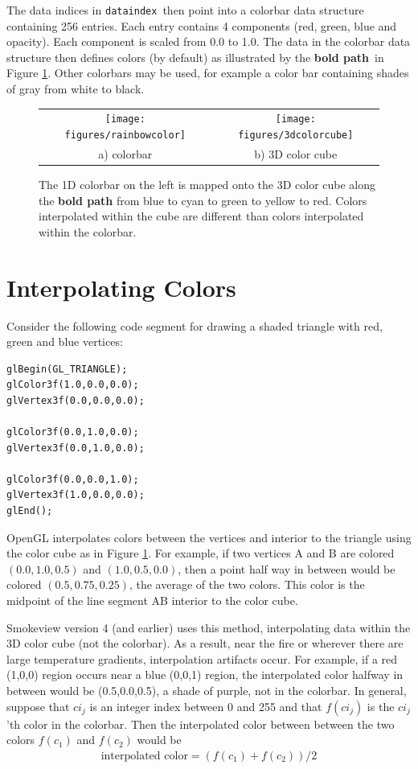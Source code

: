 \documentclass[11pt,twoside]{book}
\newcommand{\figoptions}{htp}
\begin{document}
The data indices in {\tt dataindex}\ then point into a colorbar data structure containing 256 entries.  Each entry contains 4 components (red, green, blue and opacity).  Each component is scaled from 0.0 to 1.0.  The data in the colorbar data structure then defines colors (by default) as illustrated by the {\bf bold path}\ in Figure \ref{colorbarinfo}.  Other colorbars may be used, for example a color bar containing shades of gray from white to black.


\begin{figure}[\figoptions]
\begin{center}
\begin{tabular}{cc}
\texttt{[image: figures/rainbowcolor]}&\texttt{[image: figures/3dcolorcube]}\\
a) colorbar&b) 3D color cube\\
\end{tabular}
\end{center}
\caption[1D colorbar and 3D color cube]{The 1D colorbar on the left is mapped onto the 3D color cube
along the {\bf bold path} from blue to cyan to green to yellow to red.  Colors interpolated within the cube are different than colors interpolated within the colorbar.}
\label{colorbarinfo}%
\end{figure}

\section{Interpolating Colors}

Consider the following code segment for drawing a shaded triangle with red, green and blue vertices:
\begin{verbatim}
glBegin(GL_TRIANGLE);
glColor3f(1.0,0.0,0.0);
glVertex3f(0.0,0.0,0.0);

glColor3f(0.0,1.0,0.0);
glVertex3f(0.0,1.0,0.0);

glColor3f(0.0,0.0,1.0);
glVertex3f(1.0,0.0,0.0);
glEnd();
\end{verbatim}

OpenGL interpolates colors between the vertices and interior to the triangle using the color cube as in Figure \ref{colorbarinfo}.  For example, if two vertices A and B are colored $(0.0,1.0,0.5)$ and $(1.0,0.5,0.0)$, then a point half way in between would be colored $(0.5,0.75,0.25)$, the average of the two colors.  This color is the midpoint of the line segment AB interior to the color cube.

Smokeview version 4 (and earlier) uses this method, interpolating data within the 3D color cube (not the colorbar).  As a result, near the fire or wherever there are large temperature gradients, interpolation artifacts occur.  For example, if a red (1,0,0) region occurs near a blue (0,0,1) region, the interpolated color halfway in between would be (0.5,0.0,0.5), a shade of purple, not in the colorbar.  In general, suppose that $ci_j$ is an integer index between 0 and 255 and that $f(ci_j)$ is the $ci_j$'th color in the colorbar.  Then
the interpolated color between between the two colors $f(c_1)$ and $f(c_2)$ would be
\begin{eqnarray*}
\mbox{interpolated color}=(f(c_1)+f(c_2))/2
\end{eqnarray*}
\end{document}
